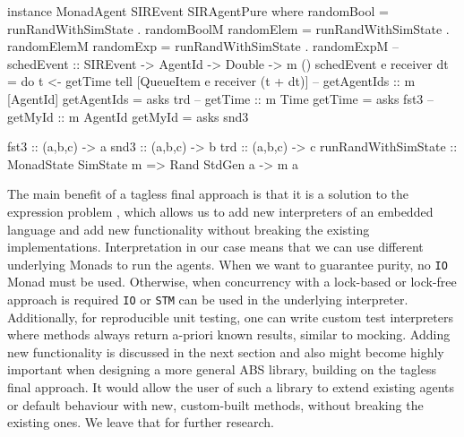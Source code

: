 \begin{HaskellCode}   
instance MonadAgent SIREvent SIRAgentPure where
  randomBool = runRandWithSimState . randomBoolM
  randomElem = runRandWithSimState . randomElemM
  randomExp  = runRandWithSimState . randomExpM
  -- schedEvent :: SIREvent -> AgentId -> Double -> m ()
  schedEvent e receiver dt = do
    t <- getTime 
    tell [QueueItem e receiver (t + dt)]
  -- getAgentIds :: m [AgentId]
  getAgentIds = asks trd
  -- getTime :: m Time
  getTime = asks fst3
  -- getMyId :: m AgentId
  getMyId = asks snd3

fst3 :: (a,b,c) -> a
snd3 :: (a,b,c) -> b
trd :: (a,b,c) -> c
runRandWithSimState :: MonadState SimState m => Rand StdGen a -> m a
\end{HaskellCode}

The main benefit of a tagless final approach is that it is a solution to the expression problem \cite{kiselyov_typed_2012}, which allows us to add new interpreters of an embedded language and add new functionality without breaking the existing implementations. Interpretation in our case means that we can use different underlying Monads to run the agents. When we want to guarantee purity, no \texttt{IO} Monad must be used. Otherwise, when concurrency with a lock-based or lock-free approach is required \texttt{IO} or \texttt{STM} can be used in the underlying interpreter. Additionally, for reproducible unit testing, one can write custom test interpreters where methods always return a-priori known results, similar to mocking. Adding new functionality is discussed in the next section and also might become highly important when designing a more general ABS library, building on the tagless final approach. It would allow the user of such a library to extend existing agents or default behaviour with new, custom-built methods, without breaking the existing ones. We leave that for further research.